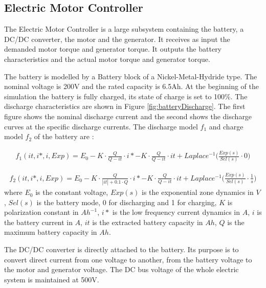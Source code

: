 \subsection{Electric Motor Controller}
The Electric Motor Controller is a large subsystem containing the battery, a DC/DC converter, the motor and the generator. It receives as input the demanded motor torque and generator torque. It outputs the battery characteristics and the actual motor torque and generator torque.

The battery is modelled by a Battery block of a Nickel-Metal-Hydride type. The nominal voltage is 200V and the rated capacity is 6.5Ah. At the beginning of the simulation the battery is fully charged, its state of charge is set to 100\%. The discharge characteristics are shown in Figure \ref{fig:batteryDischarge}. The first figure shows the nominal discharge current and the second shows the discharge curves at the specific discharge currents. The discharge model $f_1$ and charge model $f_2$ of the battery are \citep{batteryMatlab}:

\begin{equation}
\begin{split}
f_1(it,i*,i,Exp) = E_0 - K \cdot \frac{Q}{Q-it} \cdot i* - K \cdot \frac{Q}{Q-it} \cdot it + Laplace^{-1} \bigg( \frac{Exp(s)}{Sel(s)} \cdot 0 \bigg)
\end{split}
\end{equation}

\begin{equation}
\begin{split}
f_2(it,i*,i,Exp) = E_0 - K \cdot \frac{Q}{|it|+0.1 \cdot Q} \cdot i* - K \cdot \frac{Q}{Q-it} \cdot it + Laplace^{-1} \bigg( \frac{Exp(s)}{Sel(s)} \cdot \frac{1}{s} \bigg)
\end{split}
\end{equation}
where $E_0$ is the constant voltage, $Exp(s)$ is the exponential zone dynamics in $V$, $Sel(s)$ is the battery mode, 0 for discharging and 1 for charging, $K$ is polarization constant in $Ah^{-1}$, $i*$ is the low frequency current dynamics in $A$, $i$ is the battery current in $A$, $it$ is the extracted battery capacity in $Ah$, $Q$ is the maximum battery capacity in $Ah$.

The DC/DC converter is directly attached to the battery. Its purpose is to convert direct current from one voltage to another, from the battery voltage to the motor and generator voltage. The DC bus voltage of the whole electric system is maintained at 500V. 

